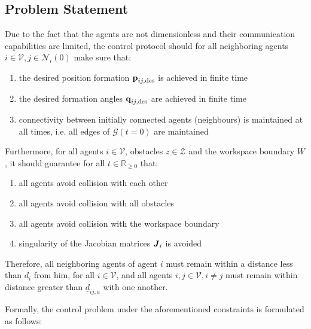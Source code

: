 \subsection{Problem Statement}
Due to the fact that the agents are not dimensionless and their communication
capabilities are limited, the control protocol should for all neighboring
agents $i \in \mathcal{V}, j \in \mathcal{N}_i(0)$ make sure that:

\begin{enumerate}
  \item the desired position formation $\bm{\mathbf{p}}_{ij, \text{des}}$ is achieved
    in finite time
  \item the desired formation angles $\bm{\mathbf{q}}_{ij, \text{des}}$ are achieved
    in finite time
  \item connectivity between initially connected agents (neighbours) is
    maintained at all times, i.e. all edges of $\mathcal{G}(t=0)$ are maintained
\end{enumerate}
Furthermore, for all agents $i \in \mathcal{V}$, obstacles $z \in \mathcal{Z}$
and the workspace boundary $W$, it should guarantee for all
$t\in\mathbb{R}_{\geq 0}$ that:

\begin{enumerate}
  \item all agents avoid collision with each other
  \item all agents avoid collision with all obstacles
  \item all agents avoid collision with the workspace boundary
  \item singularity of the Jacobian matrices $\bm{\mathit{J}}_i$ is avoided
\end{enumerate}

Therefore, all neighboring agents of agent $i$ must remain within a distance
less than $d_i$ from him, for all $i \in \mathcal{V}$,
and all agents $i, j\in \mathcal{V}, i \neq j$ must remain within distance
greater than $\underline{d}_{ij,a}$ with one another.

Formally, the control problem under the aforementioned constraints is
formulated as follows:

